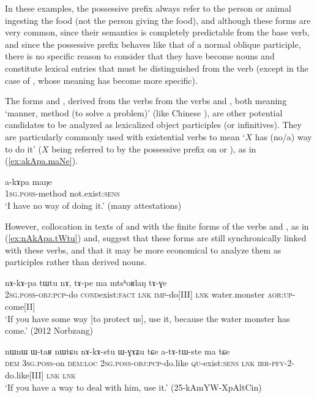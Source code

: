 In these examples, the possessive prefix always refer to the person or animal ingesting the food (not the person giving the food), and although these forms are very common, since their semantics is completely predictable from the base verb, and since the possessive prefix behaves like that of a normal oblique participle, there is no specific reason to consider that they have become nouns and constitute lexical entries that must be distinguished from the verb (except in the case of , whose meaning has become more specific).

The forms  and , derived from the verbs from the verbs  and , both meaning `manner, method (to solve a problem)' (like Chinese ), are other potential candidates to be analyzed as lexicalized object participles (or infinitives).  They are particularly commonly used with existential verbs to mean `$X$ has (no/a) way to do it' ($X$ being referred to by the possessive prefix on  or ), as in (\ref{ex:akApa.maNe}).

\begin{exe}
\ex \label{ex:akApa.maNe}
\gll a-kɤpa maŋe \\
\textsc{1sg}.\textsc{poss}-method not.exist:\textsc{sens} \\
\glt `I have no way of doing it.' (many attestations)
\end{exe}
 
However, collocation in texts of  and  with the finite forms of the verbs  and , as in (\ref{ex:nAkApa.tWtu}) and, suggest that these forms are still synchronically linked with these verbs, and that it may be more economical to analyze them as participles rather than derived nouns.
 
 \begin{exe}
\ex \label{ex:nAkApa.tWtu}
\gll  nɤ-kɤ-pa tɯ\redp{}tu nɤ,  tɤ-pe ma mtsʰoʁlaŋ tɤ-ɣe  \\
\textsc{2sg}.\textsc{poss}-\textsc{obj}:\textsc{pcp}-do \textsc{cond}\redp{}exist:\textsc{fact} \textsc{lnk} \textsc{imp}-do[III] \textsc{lnk} water.monster \textsc{aor}:\textsc{up}-come[II] \\
\glt `If you have some way [to protect us], use it, because the water monster has come.' (2012 Norbzang) 	
 \end{exe}
 
  \begin{exe}
\ex \label{ex:nAkAstu.WGAZu}
\gll   nɯnɯ ɯ-taʁ nɯtɕu nɤ-kɤ-stu ɯ-ɣɤʑu tɕe a-tɤ-tɯ-ste ma tɕe \\
\textsc{dem} \textsc{3sg}.\textsc{poss}-on \textsc{dem}:\textsc{loc} \textsc{2sg}.\textsc{poss}-\textsc{obj}:\textsc{pcp}-do.like \textsc{qu}-exist:\textsc{sens} \textsc{lnk} \textsc{irr}-\textsc{pfv}-2-do.like[III] \textsc{lnk} \textsc{lnk} \\
\glt `If you have a way to deal with him, use it.'   (25-kAmYW-XpAltCin)
 \end{exe}
 
